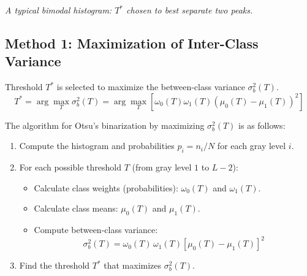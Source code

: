 \begin{center}

\textit{A typical bimodal histogram: $T^*$ chosen to best separate two peaks.}
\end{center}


\subsection{Method 1: Maximization of Inter-Class Variance}

Threshold $T^*$ is selected to maximize the between-class variance $\sigma_b^2(T)$.
$$
  T^* = \arg\max_T \sigma_b^2(T) = \arg\max_T \left[ \omega_0(T) \omega_1(T) \left( \mu_0(T) - \mu_1(T) \right)^2 \right]
$$

\noindent The algorithm for Otsu's binarization by maximizing $\sigma_b^2(T)$ is as follows:

\begin{enumerate}
    \item Compute the histogram and probabilities $p_i = n_i/N$ for each gray level $i$.
    \item For each possible threshold $T$ (from gray level $1$ to $L-2$):
    \begin{itemize}
        \item Calculate class weights (probabilities): $\omega_0(T)$ and $\omega_1(T)$.
        \item Calculate class means: $\mu_0(T)$ and $\mu_1(T)$.
        \item Compute between-class variance:
            \[
            \sigma_b^2(T) = \omega_0(T)\,\omega_1(T)\left[\mu_0(T) - \mu_1(T)\right]^2
            \]
    \end{itemize}
    \item Find the threshold $T^*$ that maximizes $\sigma_b^2(T)$.
\end{enumerate}

